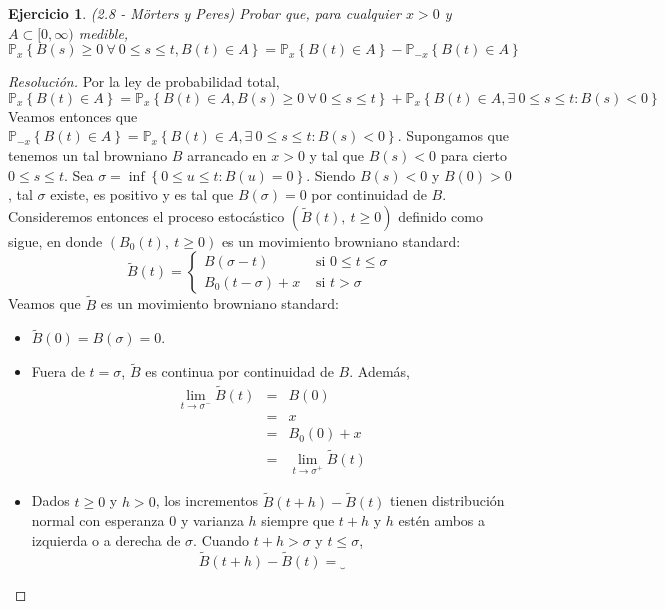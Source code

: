 \documentclass[a4paper,11pt]{article}
\newcommand{\Probx}[2]{\ensuremath{\mathbb{P}_{#1} \left\{ #2 \right\}}}
\newtheorem*{ej}{Ejercicio}
\begin{document}

\begin{ej}
(2.8 - Mörters y Peres) Probar que, para cualquier $x > 0$ y $A \subset [0,\infty)$ medible,
$$\Probx{x}{B(s) \geq 0 ~\forall~ 0 \leq s \leq t, B(t) \in A} = \Probx{x}{B(t) \in A} - \Probx{-x}{B(t) \in A}$$
\end{ej}

\begin{proof}[Resoluci\'on]
Por la ley de probabilidad total,
$$\Probx{x}{B(t) \in A} = \Probx{x}{B(t) \in A, B(s) \geq 0 ~\forall~ 0 \leq s \leq t} + 
    \Probx{x}{B(t) \in A, \exists~0 \leq s \leq t : B(s) < 0}$$
Veamos entonces que $\Probx{-x}{B(t) \in A} = \Probx{x}{B(t) \in A, \exists~0 \leq s \leq t : B(s) < 0}$. Supongamos
que tenemos un tal browniano $B$ arrancado en $x > 0$ y tal que $B(s) < 0$ para cierto $0 \leq s \leq t$.
Sea $\sigma = \inf \left\{ 0 \leq u \leq t : B(u) = 0 \right\}$. Siendo $B(s) < 0$ y $B(0) > 0$, tal $\sigma$    
existe, es positivo y es tal que $B(\sigma) = 0$ por continuidad de $B$. Consideremos entonces el proceso estocástico
$(\tilde{B}(t),~ t \geq 0)$ definido como sigue, en donde $(B_0(t),~t \geq 0)$ es un movimiento browniano standard:
$$
\tilde{B}(t) = 
\begin{cases}
B(\sigma -t) & \textrm{ si } 0 \leq t \leq \sigma \\
B_0(t - \sigma) + x & \textrm{ si } t > \sigma
\end{cases}
$$
Veamos que $\tilde{B}$ es un movimiento browniano standard:
\begin{itemize}
    \item $\tilde{B}(0) = B(\sigma) = 0$.
    \item Fuera de $t = \sigma$, $\tilde{B}$ es continua por continuidad de $B$. Además,
    \begin{eqnarray*}
        \lim_{t \to \sigma^{-}}{\tilde{B}(t)} &=& B(0) \\
            &=& x \\
            &=& B_0(0) + x \\
            &=& \lim_{t \to \sigma^{+}}{\tilde{B}(t)}
    \end{eqnarray*}
    \item Dados $t \geq 0$ y $h > 0$, los incrementos $\tilde{B}(t+h) - \tilde{B}(t)$ tienen distribución
    normal con esperanza 0 y varianza $h$ siempre que $t+h$ y $h$ estén ambos a izquierda o a derecha
    de $\sigma$. Cuando $t+h > \sigma$ y $t \leq \sigma$,
    $$\tilde{B}(t+h) - \tilde{B}(t) =
            \underbrace{            
}$$
\end{itemize}
\end{proof}
\end{document}
